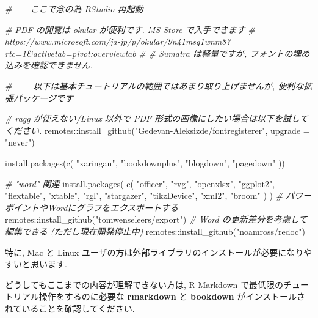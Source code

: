 \documentclass[
]{ltjsarticle}
\newenvironment{Shaded}{\begin{snugshade}}{\end{snugshade}}
\newcommand{\AttributeTok}[1]{\textcolor[rgb]{0.77,0.63,0.00}{#1}}
\newcommand{\CommentTok}[1]{\textcolor[rgb]{0.56,0.35,0.01}{\textit{#1}}}
\newcommand{\FunctionTok}[1]{\textcolor[rgb]{0.00,0.00,0.00}{#1}}
\newcommand{\NormalTok}[1]{#1}
\newcommand{\SpecialCharTok}[1]{\textcolor[rgb]{0.00,0.00,0.00}{#1}}
\newcommand{\StringTok}[1]{\textcolor[rgb]{0.31,0.60,0.02}{#1}}
\newenvironment{infobox}[1]{\begin{itemize}\renewcommand{\labelitemi}{\raisebox{-.7\height}[0pt][0pt]{%
  {\setkeys{Gin}{width=3em,keepaspectratio}\texttt{[image: \_latex/\_img/\#1]}}}}
  \setlength{\fboxsep}{1em}
  \begin{greyblock}
  \item
  }{\end{greyblock}\end{itemize}
}
\begin{document}
\begin{Shaded}
\begin{Highlighting}[numbers=left,,]
\CommentTok{\# {-}{-}{-}{-} ここで念の為 RStudio 再起動 {-}{-}{-}{-}}

\CommentTok{\# PDF の閲覧は okular が便利です. MS Store で入手できます}
\CommentTok{\# https://www.microsoft.com/ja{-}jp/p/okular/9n41msq1wnm8?rtc=1\&activetab=pivot:overviewtab}
\CommentTok{\#}
\CommentTok{\# Sumatra は軽量ですが, フォントの埋め込みを確認できません.}


\CommentTok{\# {-}{-}{-}{-}{-} 以下は基本チュートリアルの範囲ではあまり取り上げませんが, 便利な拡張パッケージです}

\CommentTok{\# ragg が使えない/Linux 以外で PDF 形式の画像にしたい場合は以下を試してください.}
\NormalTok{remotes}\SpecialCharTok{::}\FunctionTok{install\_github}\NormalTok{(}\StringTok{"Gedevan{-}Aleksizde/fontregisterer"}\NormalTok{, }\AttributeTok{upgrade =} \StringTok{"never"}\NormalTok{)}

\FunctionTok{install.packages}\NormalTok{(}\FunctionTok{c}\NormalTok{(}
  \StringTok{"xaringan"}\NormalTok{,}
  \StringTok{"bookdownplus"}\NormalTok{,}
  \StringTok{"blogdown"}\NormalTok{,}
  \StringTok{"pagedown"}
\NormalTok{))}

\CommentTok{\# "word" 関連}
\FunctionTok{install.packages}\NormalTok{(}
  \FunctionTok{c}\NormalTok{(}
    \StringTok{"officer"}\NormalTok{, }\StringTok{"rvg"}\NormalTok{, }\StringTok{"openxlsx"}\NormalTok{,}
    \StringTok{"ggplot2"}\NormalTok{, }\StringTok{"flextable"}\NormalTok{, }\StringTok{"xtable"}\NormalTok{, }\StringTok{"rgl"}\NormalTok{, }\StringTok{"stargazer"}\NormalTok{,}
    \StringTok{"tikzDevice"}\NormalTok{, }\StringTok{"xml2"}\NormalTok{, }\StringTok{"broom"}
\NormalTok{  )}
\NormalTok{)}
\CommentTok{\# パワーポイントやWordにグラフをエクスポートする}
\NormalTok{remotes}\SpecialCharTok{::}\FunctionTok{install\_github}\NormalTok{(}\StringTok{"tomwenseleers/export"}\NormalTok{)}
\CommentTok{\# Word の更新差分を考慮して編集できる (ただし現在開発停止中)}
\NormalTok{remotes}\SpecialCharTok{::}\FunctionTok{install\_github}\NormalTok{(}\StringTok{"noamross/redoc"}\NormalTok{)}
\end{Highlighting}
\end{Shaded}

特に, Mac と Linux ユーザの方は外部ライブラリのインストールが必要になりやすいと思います.

\begin{infobox}{important}
どうしてもここまでの内容が理解できない方は, R Markdown で最低限のチュートリアル操作をするのに必要な \textbf{rmarkdown} と \textbf{bookdown} がインストールされていることを確認してください.

\end{infobox}
\end{document}
